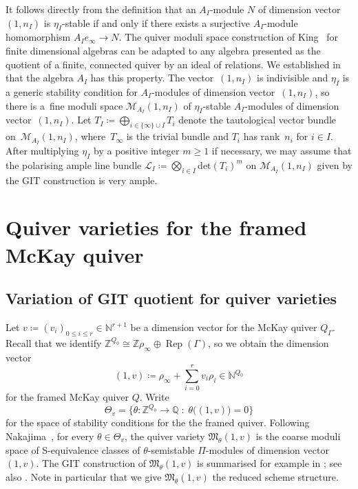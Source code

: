 \documentclass[11pt]{article}
\numberwithin{equation}{section}
\newcommand{\Rep}{\operatorname{Rep}}
\newcommand{\PiQ}{A}
\numberwithin{equation}{section}
\begin{document}
It follows directly from the definition that an $\PiQ_I$-module $N$ of dimension vector $(1,n_I)$ is $\eta_I$-stable if and only if
there exists a surjective $\PiQ_I$-module homomorphism $\PiQ_I e_{\infty} \to N$.
The quiver moduli space construction of King~\cite[Proposition~5.3]{king1994moduli} for finite dimensional algebras can be adapted to any algebra presented as the quotient of a finite, connected quiver by an ideal of relations. We established in \cite[Proposition~3.3]{craw2019punctual} that the algebra $\PiQ_I$ has this property.
The vector~$(1,n_I)$ is indivisible and $\eta_I$ is a generic stability condition for $\PiQ_I$-modules of dimension vector~$(1,n_I)$, so there is a~fine moduli space $\mathcal{M}_{\PiQ_I}(1,n_I)$
of $\eta_I$-stable $\PiQ_I$-modules of dimension
vector~$(1,n_I)$. Let $T_I \coloneqq\bigoplus_{i \in \{\infty \}\cup I } T_i$ denote the tautological vector bundle on~$\mathcal{M}_{\PiQ_I}(1,n_I)$, where~$T_{\infty}$ is the trivial bundle and $T_i$ has rank~$n_i$ for $i \in I$.
After multiplying $\eta_I$ by a positive integer $m\geq 1$ if necessary, we may assume that the polarising ample line bundle $\mathcal{L}_I \coloneqq \bigotimes_{i \in I} \mathrm{det}(T_i)^{m}$ on $\mathcal{M}_{\PiQ_I}(1,n_I)$ given by the GIT construction is very ample.



\section{Quiver varieties for the framed McKay quiver}\label{sec:quivers}

\subsection{Variation of GIT quotient for quiver varieties}
\label{subsec:quivervars}

Let $v\coloneqq(v_i)_{0 \leq i \leq r} \in \mathbb{N}^{r+1}$ be a dimension vector for the McKay quiver $Q_\Gamma$.
Recall that we identify $\mathbb{Z}^{Q_0}\cong \mathbb{Z}\rho_{\infty}\oplus \Rep(\Gamma)$, so we obtain the
dimension vector \[(1,v) \coloneqq\rho_{\infty}+\sum_{i=0}^r v_i\rho_i \in \mathbb{N}^{Q_0}
\] for the framed McKay quiver $Q$. Write
\[ \Theta_{v}=\big\{\theta\colon \mathbb{Z}^{Q_0} \to \mathbb{Q}\; : \; \theta\big((1,v)\big)=0 \big\} \]
for the space of stability conditions for the
the framed quiver. Following Nakajima~\cite{nakajima1994instantons, Nakajima98}, for every $\theta \in \Theta_{v}$, the quiver variety $\mathfrak{M}_{\theta}(1,v)$ is the coarse moduli space of S-equivalence classes of $\theta$-semistable $\Pi$-modules of dimension vector $(1,v)$. The GIT construction of $\mathfrak{M}_{\theta}(1,v)$ is summarised for example in \cite[Section 2]{craw2019punctual}; see also \cite[Section 2]{nakajima2009quiver}. Note in particular that we give $\mathfrak{M}_{\theta}(1,v)$ the reduced scheme structure.
\end{document}
